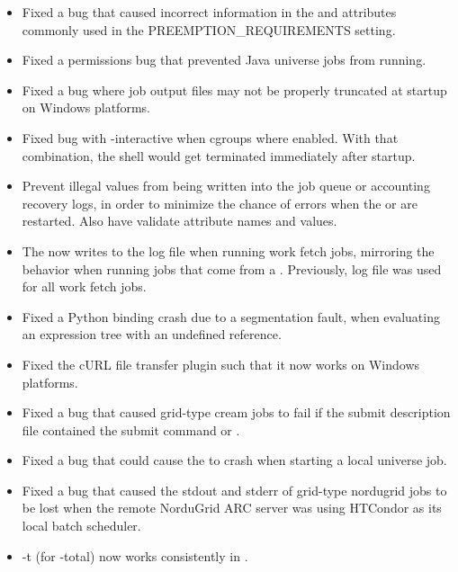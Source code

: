 \begin{itemize}

\item Fixed a bug that caused incorrect information in the
 and  attributes
commonly used in the  PREEMPTION\_REQUIREMENTS
setting.

\item Fixed a permissions bug that prevented Java universe jobs
from running.

\item Fixed a bug where job output files may not be properly truncated
at startup on Windows platforms. 

\item Fixed bug with  -interactive when
cgroups where enabled.  With that combination, the shell would
get terminated immediately after startup.

\item Prevent illegal values from being written into the job queue
or accounting recovery logs, in order to minimize the chance of errors when
the  or  are restarted. Also
have  validate attribute names and values.

\item The  now writes to the log file
 when running work fetch jobs, mirroring the
behavior when running jobs that come from a .
Previously, log file  was used for all work fetch
jobs.

\item Fixed a Python binding crash due to a segmentation fault, when evaluating an expression tree with an undefined reference.

\item Fixed the cURL file transfer plugin such that it now works
on Windows platforms.

\item Fixed a bug that caused grid-type cream jobs to fail if the submit
description file contained the submit command  or
.

\item Fixed a bug that could cause the  to crash when
starting a local universe job.

\item Fixed a bug that caused the stdout and stderr of grid-type
nordugrid jobs to be lost when the remote NorduGrid ARC server was
using HTCondor as its local batch scheduler.

\item -t (for -total) now works consistently in .

\end{itemize}


